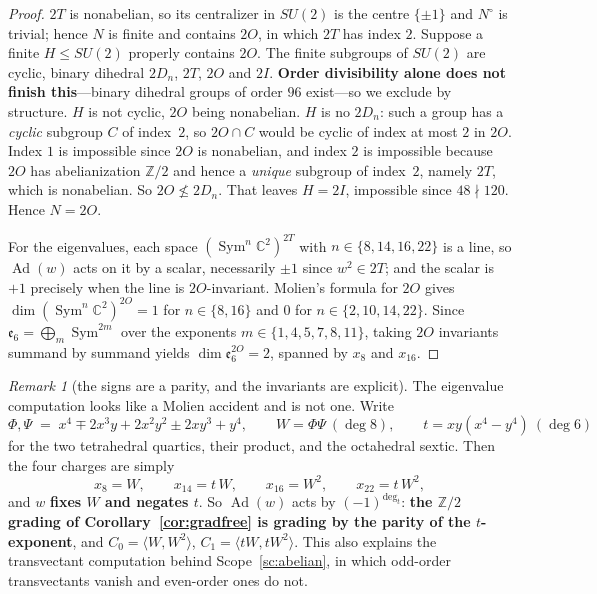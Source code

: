 \documentclass[11pt,reqno]{amsart}
\theoremstyle{plain}
\theoremstyle{definition}
\theoremstyle{remark}
\newtheorem{remark}[theorem]{Remark}
\newcommand{\Z}{\mathbb{Z}}
\newcommand{\C}{\mathbb{C}}
\newcommand{\ee}{\mathfrak{e}}
\newcommand{\Ad}{\operatorname{Ad}}
\newcommand{\Sym}{\operatorname{Sym}}
\begin{document}
\begin{proof}
$2T$ is nonabelian, so its centralizer in $SU(2)$ is the centre $\{\pm1\}$ and $N^{\circ}$
is trivial; hence $N$ is finite and contains $2O$, in which $2T$ has index $2$. Suppose a finite $H\le SU(2)$ properly contains $2O$. The finite
subgroups of $SU(2)$ are cyclic, binary dihedral $2D_n$, $2T$, $2O$ and $2I$.
\textbf{Order divisibility alone does not finish this}---binary dihedral groups of order
$96$ exist---so we exclude by structure. $H$ is not cyclic, $2O$ being nonabelian. $H$ is no $2D_n$: such a group has a
\emph{cyclic} subgroup $C$ of index~$2$, so $2O\cap C$ would be cyclic of index at most
$2$ in $2O$. Index $1$ is impossible since $2O$ is nonabelian, and index $2$ is
impossible because $2O$ has abelianization $\Z/2$ and hence a \emph{unique} subgroup of
index~$2$, namely $2T$, which is nonabelian. So $2O\not\le 2D_n$. That leaves $H=2I$, impossible since $48\nmid120$.
Hence $N=2O$.

For the eigenvalues, each space $(\Sym^{n}\C^2)^{2T}$ with $n\in\{8,14,16,22\}$ is a line,
so $\Ad(w)$ acts on it by a scalar, necessarily $\pm1$ since $w^2\in 2T$; and the scalar is
$+1$ precisely when the line is $2O$-invariant. Molien's formula for $2O$ gives
$\dim(\Sym^{n}\C^2)^{2O}=1$ for $n\in\{8,16\}$ and $0$ for $n\in\{2,10,14,22\}$. Since
$\ee_6=\bigoplus_{m}\Sym^{2m}$ over the exponents $m\in\{1,4,5,7,8,11\}$, taking $2O$
invariants summand by summand yields $\dim\ee_6^{2O}=2$, spanned by $x_8$ and $x_{16}$.
\end{proof}

\begin{remark}[the signs are a parity, and the invariants are explicit]\label{rem:tparity}
The eigenvalue computation looks like a Molien accident and is not one. Write
\[
   \Phi,\Psi \;=\; x^4\mp2x^3y+2x^2y^2\pm2xy^3+y^4,\qquad
   W=\Phi\Psi\ (\deg 8),\qquad t=xy(x^4-y^4)\ (\deg 6)
\]
for the two tetrahedral quartics, their product, and the octahedral sextic. Then the four
charges are simply
\[
   x_8=W,\qquad x_{14}=t\,W,\qquad x_{16}=W^2,\qquad x_{22}=t\,W^2,
\]
and $w$ \textbf{fixes $W$ and negates $t$}. So $\Ad(w)$ acts by $(-1)^{\deg_t}$:
\textbf{the $\Z/2$ grading of Corollary~\ref{cor:gradfree} is grading by the parity of the
$t$-exponent}, and $C_0=\langle W,W^2\rangle$, $C_1=\langle tW,tW^2\rangle$. This also
explains the transvectant computation behind Scope~\ref{sc:abelian}, in which odd-order
transvectants vanish and even-order ones do not.
\end{remark}
\end{document}
